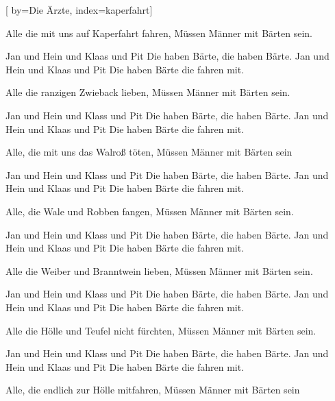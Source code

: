 
[%
    by={Die \"{A}rzte},
    index={kaperfahrt}]


    \label{kaperfahrt}

    \beginverse
        Alle die mit uns auf Kaperfahrt fahren,
        M\"{u}ssen M\"{a}nner mit B\"{a}rten sein.
    \endverse

    \beginchorus
        Jan und Hein und Klaas und Pit
        Die haben B\"{a}rte, die haben B\"{a}rte.
        Jan und Hein und Klaas und Pit
        Die haben B\"{a}rte die fahren mit.
    \endchorus

    \beginverse
        Alle die ranzigen Zwieback lieben,
        M\"{u}ssen M\"{a}nner mit B\"{a}rten sein.
    \endverse

    \beginchorus
        Jan und Hein und Klass und Pit
        Die haben B\"{a}rte, die haben B\"{a}rte.
        Jan und Hein und Klaas und Pit
        Die haben B\"{a}rte die fahren mit.
    \endchorus

    \beginverse
        Alle, die mit uns das Walro\ss{} t\"{o}ten,
        M\"{u}ssen M\"{a}nner mit B\"{a}rten sein
    \endverse

    \beginchorus
        Jan und Hein und Klass und Pit
        Die haben B\"{a}rte, die haben B\"{a}rte.
        Jan und Hein und Klaas und Pit
        Die haben B\"{a}rte die fahren mit.
    \endchorus

    \beginverse
        Alle, die Wale und Robben fangen,
        M\"{u}ssen M\"{a}nner mit B\"{a}rten sein.
    \endverse

    \beginchorus
        Jan und Hein und Klass und Pit
        Die haben B\"{a}rte, die haben B\"{a}rte.
        Jan und Hein und Klaas und Pit
        Die haben B\"{a}rte die fahren mit.
    \endchorus

    \beginverse
        Alle die Weiber und Branntwein lieben,
        M\"{u}ssen M\"{a}nner mit B\"{a}rten sein.
    \endverse

    \beginchorus
        Jan und Hein und Klass und Pit
        Die haben B\"{a}rte, die haben B\"{a}rte.
        Jan und Hein und Klaas und Pit
        Die haben B\"{a}rte die fahren mit.
    \endchorus

    \beginverse
        Alle die H\"{o}lle und Teufel nicht f\"{u}rchten,
        M\"{u}ssen M\"{a}nner mit B\"{a}rten sein.
    \endverse

    \beginchorus
        Jan und Hein und Klass und Pit
        Die haben B\"{a}rte, die haben B\"{a}rte.
        Jan und Hein und Klaas und Pit
        Die haben B\"{a}rte die fahren mit.
    \endchorus

    \beginverse
        Alle, die endlich zur H\"{o}lle mitfahren,
        M\"{u}ssen M\"{a}nner mit B\"{a}rten sein
    \endverse
\endsong
